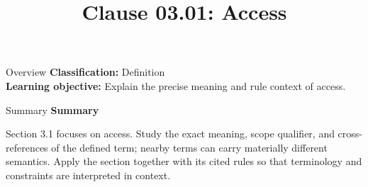 \documentclass[10pt,letterpaper]{article}
\title{Clause 03.01: Access}
\author{}
\date{}
\begin{document}
\maketitle
\begin{CornellOverviewBox}{Overview}
\textbf{Classification:} Definition\\[2pt]
\textbf{Learning objective:} Explain the precise meaning and rule context of access.
\end{CornellOverviewBox}\begin{CornellSummaryBox}{Summary}
{\sffamily\bfseries\color{Accent} Summary}\par\vspace{3pt}Section 3.1 focuses on access. Study the exact meaning, scope qualifier, and cross-references of the defined term; nearby terms can carry materially different semantics. Apply the section together with its cited rules so that terminology and constraints are interpreted in context.
\end{CornellSummaryBox}
\end{document}
